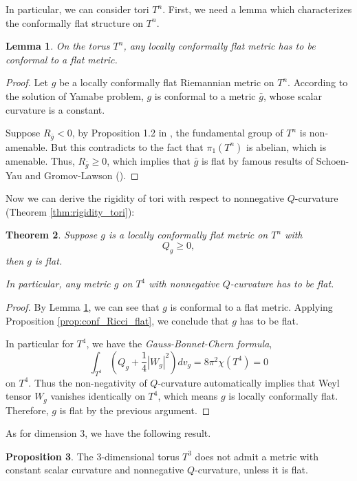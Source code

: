 \documentclass[12pt]{amsart}
\newtheorem{theorem}{Theorem}[section]
\newtheorem{lemma}[theorem]{Lemma}
\theoremstyle{definition}
\newtheorem{proposition}[theorem]{Proposition}
\theoremstyle{remark}
\numberwithin{equation}{section}
\begin{document}
In particular, we can consider tori $T^n$. First, we need a lemma which characterizes the conformally flat structure on $T^n$.

\begin{lemma}\label{lem:conf_structure_tori}
On the torus $T^n$, any locally conformally flat metric has to be conformal to a flat metric.
\end{lemma}

\begin{proof}
Let $g$ be a locally conformally flat Riemannian metric on $T^n$. According to the solution of Yamabe problem, $g$ is conformal to a metric $\bar g$, whose scalar curvature is a constant. 

Suppose $R_{\bar g} < 0$, by Proposition 1.2 in \cite{S-Y_3}, the fundamental group of $T^n$ is non-amenable. But this contradicts to the fact that $\pi_1(T^n)$ is abelian, which is amenable. Thus, $R_{\bar g} \geq 0$, which implies that $\bar g$ is flat by famous results of Schoen-Yau and Gromov-Lawson (\cite{S-Y_1, S-Y_2, G-L_1, G-L_2}).
\end{proof}

Now we can derive the rigidity of tori with respect to nonnegative $Q$-curvature (Theorem \ref{thm:rigidity_tori}):

\begin{theorem}
Suppose $g$ is a locally conformally flat metric on $T^n$ with $$Q_g \geq 0,$$ then $g$ is flat. 

In particular, any metric $g$ on $T^4$ with nonnegative $Q$-curvature has to be flat.
\end{theorem}
\begin{proof}
By Lemma \ref{lem:conf_structure_tori}, we can see that $g$ is conformal to a flat metric. Applying Proposition \ref{prop:conf_Ricci_flat}, we conclude that $g$ has to be flat.

In particular for $T^4$, we have the \emph{Gauss-Bonnet-Chern formula}, 
$$\int_{T^4} \left( Q_g + \frac{1}{4}|W_g|^2 \right) dv_{g} = 8\pi^2 \chi(T^4) = 0$$
on $T^4$. Thus the non-negativity of $Q$-curvature automatically implies that Weyl tensor $W_g$ vanishes identically on $T^4$, which means $g$ is locally conformally flat. Therefore, $g$ is flat by the previous argument. 
\end{proof}

As for dimension 3, we have the following result.

\begin{proposition}
The $3$-dimensional torus $T^3$ does not admit a metric with constant scalar curvature and nonnegative $Q$-curvature, unless it is flat.
\end{proposition}
\end{document}

